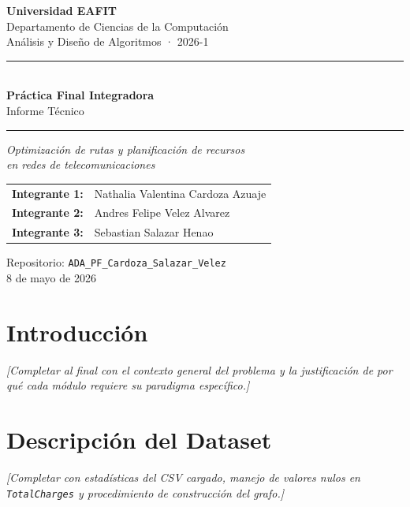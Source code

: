 \documentclass[12pt, a4paper]{article}
\begin{document}
\thispagestyle{empty}

\begin{center}
  \vspace*{1.5cm}
  {\large\bfseries Universidad EAFIT}\\[4pt]
  {\normalsize Departamento de Ciencias de la Computación}\\[2pt]
  {\normalsize Análisis y Diseño de Algoritmos · 2026-1}

  \vspace{2.5cm}
  \rule{\linewidth}{0.6pt}\\[10pt]
  {\LARGE\bfseries Práctica Final Integradora}\\[8pt]
  {\large Informe Técnico}\\[10pt]
  \rule{\linewidth}{0.6pt}

  \vspace{1cm}
  {\normalsize\itshape
    Optimización de rutas y planificación de recursos\\
    en redes de telecomunicaciones}

  \vspace{2cm}
  \begin{tabular}{rl}
    \textbf{Integrante 1:} & Nathalia Valentina Cardoza Azuaje \\[4pt]
    \textbf{Integrante 2:} & Andres Felipe Velez Alvarez \\[4pt]
    \textbf{Integrante 3:} & Sebastian Salazar Henao
  \end{tabular}

  \vspace{1.5cm}
  {\small Repositorio: \texttt{ADA\_PF\_Cardoza\_Salazar\_Velez}}\\[4pt]
  {\small 8 de mayo de 2026}
\end{center}

\newpage

\tableofcontents
\newpage

\section{Introducción}
\textit{[Completar al final con el contexto general del problema y la justificación de por qué cada módulo requiere su paradigma específico.]}

\section{Descripción del Dataset}
\textit{[Completar con estadísticas del CSV cargado, manejo de valores nulos en \texttt{TotalCharges} y procedimiento de construcción del grafo.]}
\end{document}
